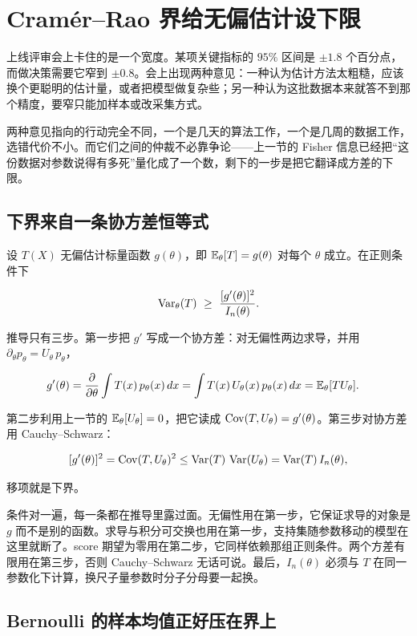 \section{Cramér--Rao 界给无偏估计设下限}
\label{sec:11-Mathematical-Statistics/03-Sufficient-Statistics-and-Information/03}

上线评审会上卡住的是一个宽度。某项关键指标的 \(95\%\) 区间是 \(\pm 1.8\) 个百分点，而做决策需要它窄到 \(\pm 0.8\)。会上出现两种意见：一种认为估计方法太粗糙，应该换个更聪明的估计量，或者把模型做复杂些；另一种认为这批数据本来就答不到那个精度，要窄只能加样本或改采集方式。

两种意见指向的行动完全不同，一个是几天的算法工作，一个是几周的数据工作，选错代价不小。而它们之间的仲裁不必靠争论——上一节的 Fisher 信息已经把``这份数据对参数说得有多死''量化成了一个数，剩下的一步是把它翻译成方差的下限。

\subsection{下界来自一条协方差恒等式}

设 \(T(X)\) 无偏估计标量函数 \(g(\theta)\)，即 \(\mathbb{E}_\theta[T]=g(\theta)\) 对每个 \(\theta\) 成立。在正则条件下

\[
\Var_\theta(T)\ \ge\ \frac{[g'(\theta)]^2}{I_n(\theta)}.
\]

推导只有三步。第一步把 \(g'\) 写成一个协方差：对无偏性两边求导，并用 \(\partial_\theta p_\theta=U_\theta\,p_\theta\)，

\[
\begin{aligned}
g'(\theta)&=\frac{\partial}{\partial\theta}\int T(x)\,p_\theta(x)\,dx
=\int T(x)\,U_\theta(x)\,p_\theta(x)\,dx=\mathbb{E}_\theta[TU_\theta].
\end{aligned}
\]

第二步利用上一节的 \(\mathbb{E}_\theta[U_\theta]=0\)，把它读成 \(\operatorname{Cov}(T,U_\theta)=g'(\theta)\)。第三步对协方差用 Cauchy--Schwarz：

\[
[g'(\theta)]^2=\operatorname{Cov}(T,U_\theta)^2\le\operatorname{Var}(T)\,\operatorname{Var}(U_\theta)=\operatorname{Var}(T)\,I_n(\theta),
\]

移项就是下界。

条件对一遍，每一条都在推导里露过面。无偏性用在第一步，它保证求导的对象是 \(g\) 而不是别的函数。求导与积分可交换也用在第一步，支持集随参数移动的模型在这里就断了。score 期望为零用在第二步，它同样依赖那组正则条件。两个方差有限用在第三步，否则 Cauchy--Schwarz 无话可说。最后，\(I_n(\theta)\) 必须与 \(T\) 在同一参数化下计算，换尺子量参数时分子分母要一起换。

\subsection{Bernoulli 的样本均值正好压在界上}

